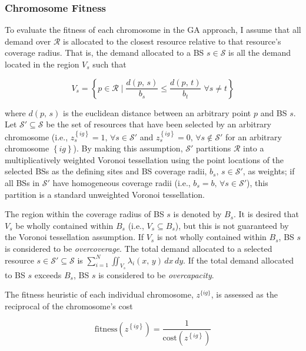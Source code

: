 \documentclass[12pt,dvipsnames]{report}
\begin{document}
\subsubsection{Chromosome Fitness}

To evaluate the fitness of each chromosome in the GA approach, I assume that all demand over $\mathcal{R}$ is allocated to the closest resource relative to that resource's coverage radius.  That is, the demand allocated to a BS $s \in \mathcal{S}$ is all the demand located in the region $V_s$ such that

\begin{equation}
V_s = \left\{ p \in \mathcal{R} \mid \frac{d \left( p,\, s \right)}{b_s} \leq \frac{d \left( p,\, t \right)}{b_t} \; \forall s \neq t \right\}
\end{equation}

\noindent where $d \left( p,\, s \right)$ is the euclidean distance between an arbitrary point $p$ and BS $s$.  Let $\mathcal{S}' \subseteq \mathcal{S}$ be the set of resources that have been selected by an arbitrary chromosome (i.e., $z_s^{\left\{ ig \right\}} = 1,\, \forall s \in \mathcal{S}'$ and $z_s^{\left\{ ig \right\}} = 0,\, \forall s \not\in \mathcal{S}'$ for an arbitrary chromosome $\left\{ ig \right\}$).  By making this assumption, $\mathcal{S}'$ partitions $\mathcal{R}$ into a multiplicatively weighted Voronoi tessellation using the point locations of the selected BSs as the defining sites and BS coverage radii, $b_s,\, s \in \mathcal{S}'$, as weights; if all BSs in $\mathcal{S}'$ have homogeneous coverage radii (i.e., $b_s = b,\, \forall s \in \mathcal{S}'$), this partition is a standard unweighted Voronoi tessellation.

The region within the coverage radius of BS $s$ is denoted by $B_s$.  It is desired that $V_s$ be wholly contained within $B_s$ (i.e., $V_s \subseteq B_s$), but this is not guaranteed by the Voronoi tessellation assumption.  If $V_s$ is not wholly contained within $B_s$, BS $s$ is considered to be \emph{overcoverage}.  The total demand allocated to a selected resource $s \in \mathcal{S}' \subseteq \mathcal{S}$ is $\sum_{i = 1}^N \iint_{V_s} \lambda_i \left( x,\, y \right) \,dx \,dy$.  If the total demand allocated to BS $s$ exceeds $B_s$, BS $s$ is considered to be \emph{overcapacity}.

The fitness heuristic of each individual chromosome, $z^{\{ig\}}$, is assessed as the reciprocal of the chromosome's cost

\begin{equation} \label{eq:GAFit}
\text{fitness}\left( z^{\left\{ ig \right\}} \right) = \frac{1}{\text{cost}\left( z^{\left\{ ig \right\}} \right)}
\end{equation}
\end{document}
